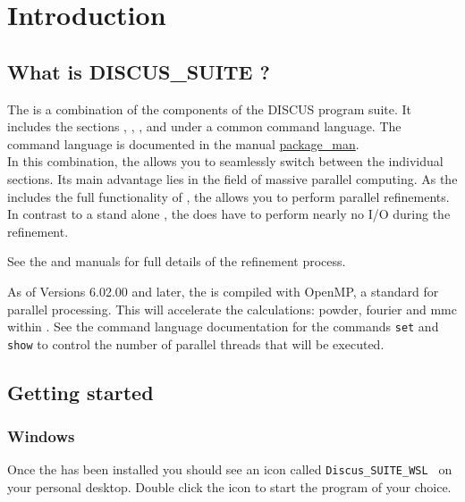 
\chapter{Introduction \label{intro}}
\section{What is DISCUS\_SUITE ?}

The \Suite is a combination of the components of the DISCUS program 
suite. It includes the sections 
\href{./discus\_man.pdf}\discus, 
\href{./diffev\_man.pdf}\diffev, 
\href{./refine\_man.pdf}, and
\href{./kuplot\_man.pdf}\Kuplot under a common  command language. 
The command language is documented in the manual 
\href{./package\_man.pdf}{package\_man}.\\
In this combination, the 
\Suite allows you to seamlessly switch between the individual
sections. Its main advantage lies in the field of massive parallel 
computing. As the \Suite includes the full functionality of 
\diffev, the \Suite allows you to perform parallel refinements.
In contrast to a stand alone \diffev, the \Suite does have to
perform nearly no I/O during the refinement.

See the \Diffev and \Refine manuals for full details of the 
refinement process.

As of Versions 6.02.00 and later, the \Suite is compiled with
OpenMP, a standard for parallel processing. This will accelerate
the calculations: powder, fourier and mmc within \discus. See the
command language documentation for the commands {\tt set} and
{\tt show} to control the number of parallel threads that will be 
executed.


\section{Getting started \label{intro-get}}

\subsection{Windows}

Once the \Suite has been installed you should see an icon called
{\tt Discus\_SUITE\_WSL\ }
on your personal desktop. Double click the icon to start
the program of your choice.

